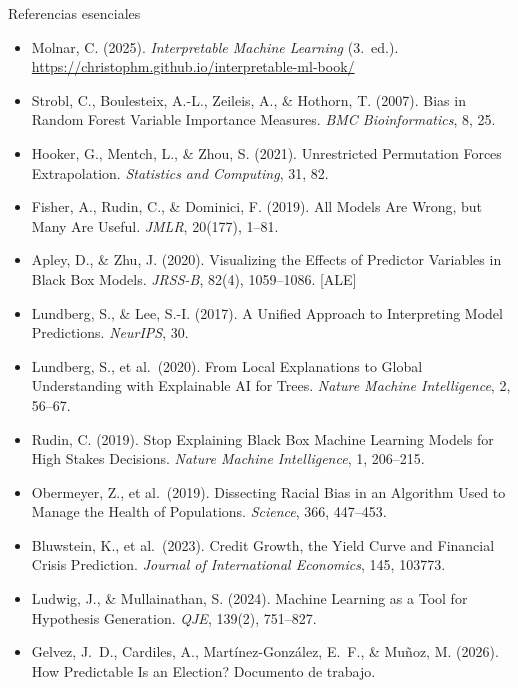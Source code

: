 \documentclass{beamer}
\newcommand{\1}{\mathbb{I}}
\begin{document}
\begin{frame}{Referencias esenciales}
\scriptsize
\begin{itemize}\itemsep0pt
  \item Molnar, C. (2025). \emph{Interpretable Machine Learning} (3.\ ed.). \url{https://christophm.github.io/interpretable-ml-book/}
  \item Strobl, C., Boulesteix, A.-L., Zeileis, A., \& Hothorn, T. (2007). Bias in Random Forest Variable Importance Measures. \emph{BMC Bioinformatics}, 8, 25.
  \item Hooker, G., Mentch, L., \& Zhou, S. (2021). Unrestricted Permutation Forces Extrapolation. \emph{Statistics and Computing}, 31, 82.
  \item Fisher, A., Rudin, C., \& Dominici, F. (2019). All Models Are Wrong, but Many Are Useful. \emph{JMLR}, 20(177), 1--81.
  \item Apley, D., \& Zhu, J. (2020). Visualizing the Effects of Predictor Variables in Black Box Models. \emph{JRSS-B}, 82(4), 1059--1086. [ALE]
  \item Lundberg, S., \& Lee, S.-I. (2017). A Unified Approach to Interpreting Model Predictions. \emph{NeurIPS}, 30.
  \item Lundberg, S., et al.\ (2020). From Local Explanations to Global Understanding with Explainable AI for Trees. \emph{Nature Machine Intelligence}, 2, 56--67.
  \item Rudin, C. (2019). Stop Explaining Black Box Machine Learning Models for High Stakes Decisions. \emph{Nature Machine Intelligence}, 1, 206--215.
  \item Obermeyer, Z., et al.\ (2019). Dissecting Racial Bias in an Algorithm Used to Manage the Health of Populations. \emph{Science}, 366, 447--453.
  \item Bluwstein, K., et al.\ (2023). Credit Growth, the Yield Curve and Financial Crisis Prediction. \emph{Journal of International Economics}, 145, 103773.
  \item Ludwig, J., \& Mullainathan, S. (2024). Machine Learning as a Tool for Hypothesis Generation. \emph{QJE}, 139(2), 751--827.
  \item Gelvez, J.\ D., Cardiles, A., Martínez-González, E.\ F., \& Muñoz, M. (2026). How Predictable Is an Election? Documento de trabajo.
\end{itemize}
\normalsize
\end{frame}


\appendix
\end{document}
